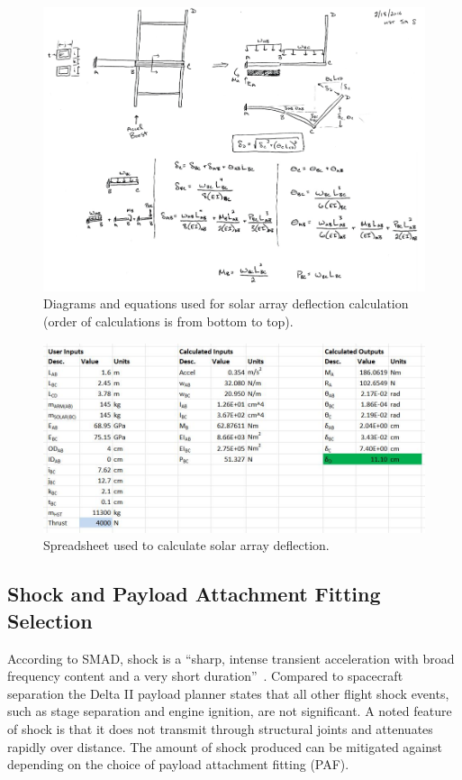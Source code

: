 \documentclass[paper=letter, fontsize=11pt]{scrartcl} %
\numberwithin{equation}{section} %
\numberwithin{figure}{section} %
\numberwithin{table}{section} %
\begin{document}
\begin{figure}[H]
    \begin{center}
        \includegraphics[width=.8\textwidth]{Pics/boomdefl.png}
        \caption{Diagrams and equations used for solar array deflection calculation (order of calculations is from bottom to top).}
        \label{fig:p13}
    \end{center}
\end{figure}

\begin{figure}[H]
    \begin{center}
        \includegraphics[width=.8\textwidth]{Pics/14.png}
        \caption{Spreadsheet used to calculate solar array deflection.}
        \label{fig:p14}
    \end{center}
\end{figure}

\subsection{Shock and Payload Attachment Fitting Selection}

According to SMAD, shock is a ``sharp, intense transient acceleration with broad frequency content and a very short duration''~\cite{ref12_8}. Compared to spacecraft separation the Delta II payload planner states that all other flight shock events, such as stage separation and engine ignition, are not significant. A noted feature of shock is that it does not transmit through structural joints and attenuates rapidly over distance. The amount of shock produced can be mitigated against depending on the choice of payload attachment fitting (PAF).
\end{document}
